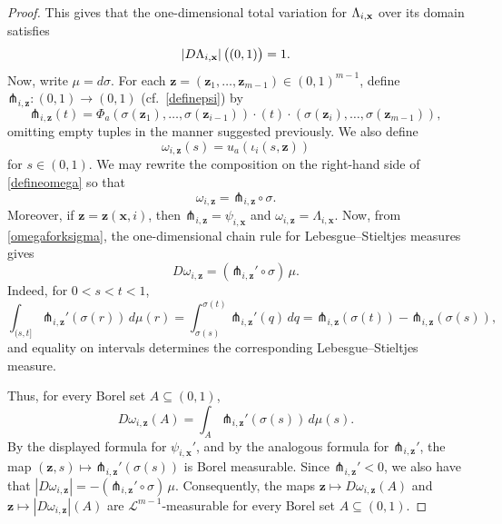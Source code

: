 \documentclass{publicadapt}
\newcommand{\pfork}{\mathord{\pitchfork}}
\begin{document}
\begin{proof}
 This gives that the one-dimensional total variation for $\Lambda_{i, \text{{\bf x}}}$ over its domain
 satisfies
\begin{equation}\label{onedimensional}
 \left| D\Lambda_{i, \text{{\bf x}}} \right|\big( (0, 1) \big) = 1. 
\end{equation}
 Now, write \(\mu=d\sigma\). For each
\(\mathbf z=(\mathbf z_1,\ldots,\mathbf z_{m-1})\in(0,1)^{m-1}\), define
$
\pfork_{i,\mathbf z}\colon(0,1)\to(0,1)
$ (cf.\ \eqref{definepsi})
by
$$
\pfork_{i,\mathbf z}(t)
=
\Phi_a\left(
\sigma(\mathbf z_1),\ldots,\sigma(\mathbf z_{i-1}) \right) \cdot \left( 
t\right) \cdot \left( 
\sigma(\mathbf z_i),\ldots,\sigma(\mathbf z_{m-1})
\right),
$$
   omitting empty tuples in the manner suggested previously. 
 We also define 
\begin{equation}\label{defineomega}
\omega_{i,\mathbf z}(s)
=
u_a(\iota_i(s,\mathbf z)) 
\end{equation}
 for $s\in(0,1)$. We may rewrite the composition on the right-hand side of \eqref{defineomega} so that 
\begin{equation}\label{omegaforksigma}
\omega_{i,\mathbf z}
=
\pfork_{i,\mathbf z}\circ\sigma.
\end{equation}
 Moreover, if \(\mathbf z=\mathbf z(\mathbf x,i)\), then
$
\pfork_{i,\mathbf z}=\psi_{i,\mathbf x}$ and $ \omega_{i,\mathbf z}=\Lambda_{i,\mathbf x}$. 
 Now, from \eqref{omegaforksigma}, 
the one-dimensional chain rule for Lebesgue--Stieltjes measures gives
\begin{equation}\label{Domega-chain}
D\omega_{i,\mathbf z}
=
(\pfork_{i,\mathbf z}'\circ\sigma)\,\mu .
\end{equation}
 Indeed, for \(0<s<t<1\),
\[
\int_{(s,t]} \pfork_{i,\mathbf z}'(\sigma(r))\,d\mu(r)
=
\int_{\sigma(s)}^{\sigma(t)}\pfork_{i,\mathbf z}'(q)\,dq
=
\pfork_{i,\mathbf z}(\sigma(t))-\pfork_{i,\mathbf z}(\sigma(s)),
\]
and equality on intervals determines the corresponding Lebesgue--Stieltjes
measure.

Thus, for every Borel set \(A\subseteq(0,1)\),
\[
D\omega_{i,\mathbf z}(A)
=
\int_A \pfork_{i,\mathbf z}'(\sigma(s))\,d\mu(s).
\]
By the displayed formula for \(\psi_{i,\mathbf x}'\), and by the analogous
formula for \(\pfork_{i,\mathbf z}'\), the map
$
(\mathbf z,s)\mapsto \pfork_{i,\mathbf z}'(\sigma(s))
$
is Borel measurable.
 Since \(\pfork_{i,\mathbf z}'<0\), we also have that 
$
|D\omega_{i,\mathbf z}|
=
-(\pfork_{i,\mathbf z}'\circ\sigma)\,\mu$.
 Consequently, the maps
$
\mathbf z\mapsto D\omega_{i,\mathbf z}(A)$ and $
\mathbf z\mapsto |D\omega_{i,\mathbf z}|(A)$
 are \(\mathcal L^{m-1}\)-measurable for every Borel set
\(A\subseteq(0,1)\).


\end{proof}
\end{document}
